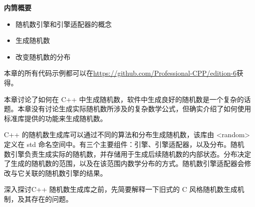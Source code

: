 \noindent
\textbf{内筒概要}

\begin{itemize}
\item
随机数引擎和引擎适配器的概念

\item
生成随机数

\item
改变随机数的分布
\end{itemize}

本章的所有代码示例都可以在\url{https://github.com/Professional-CPP/edition-6}获得。

本章讨论了如何在 C++ 中生成随机数，软件中生成良好的随机数是一个复杂的话题。本章没有讨论生成实际随机数所涉及的复杂数学公式，但确实介绍了如何使用标准库提供的功能来生成随机数。

C++ 的随机数生成库可以通过不同的算法和分布生成随机数，该库由 <random> 定义在 std 命名空间中。有三个主要组件：引擎、引擎适配器，以及分布。随机数引擎负责生成实际的随机数，并存储用于生成后续随机数的内部状态。分布决定了生成的随机数的范围，以及在该范围内数学分布的方式。随机数引擎适配器会修改与它关联的随机数引擎的结果。

深入探讨C++ 随机数生成库之前，先简要解释一下旧式的 C 风格随机数生成机制，及其存在的问题。










